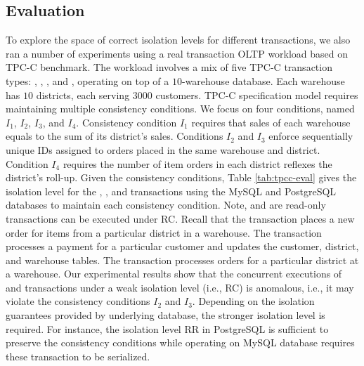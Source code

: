 \subsection{Evaluation}

To explore the space of correct isolation levels for different transactions, we  also  ran a number  of experiments using  a real transaction OLTP workload   based on TPC-C benchmark.  
 The  workload  involves  a mix of five TPC-C transaction types: 
,  ,  ,  and  , 
operating on top of  a $10$-warehouse database.  
Each warehouse has  $10$ districts, each serving $3000$ customers. 
TPC-C  specification model  requires  maintaining multiple   consistency conditions.  We focus  on   four conditions, named $I_1$, $I_2$, $I_3$, and $I_4$.   
Consistency condition $I_1$  requires that  sales of each  warehouse  equals to the  sum of    its  district's sales.  Conditions $I_2$ and $I_3$  enforce  
 sequentially unique IDs assigned to  orders placed in the same   warehouse and district. Condition $I_4$ requires 
 the  number of  item orders   in each district 
  reflexes  the district's roll-up. 
Given the consistency conditions,  Table  \ref{tab:tpcc-eval} gives the isolation level  for the ,  ,  and  transactions using the  MySQL and PostgreSQL databases   to maintain   each consistency condition. Note,    and     are read-only transactions can be executed under RC.   
Recall that the  transaction places a new order for
 items from a particular district in a warehouse.  
The  transaction  processes  a payment for a particular customer and updates the customer, district, and warehouse tables. 
 The    transaction processes  orders for a particular   district at  a warehouse. 
 Our experimental results  show that  the concurrent executions of      
    and   transactions under a weak isolation level (i.e.,  RC) is anomalous, i.e., it may violate the consistency conditions $I_2$ and $I_3$. Depending on the isolation guarantees provided  by  underlying database,   the stronger  isolation level is required. For instance, the isolation level RR in PostgreSQL  is sufficient to preserve the consistency  conditions while  operating on MySQL database  requires  these transaction to be serialized.  


